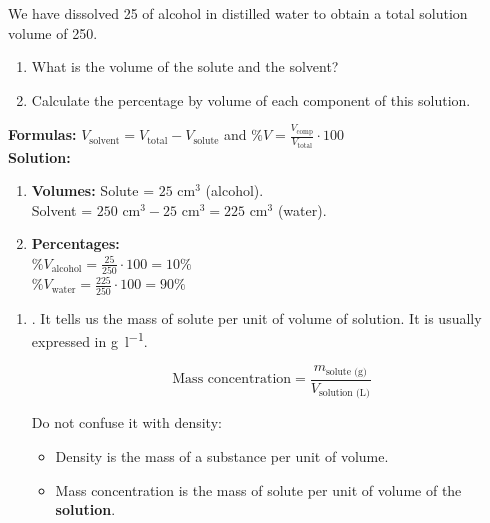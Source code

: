 \begin{exercise}
    We have dissolved \qty{25}{\cmcubicos} of alcohol in distilled water to obtain a total solution volume of \qty{250}{\cmcubicos}.
    \begin{enumerate}[label=\letraminuscula]
        \item What is the volume of the solute and the solvent?
        \item Calculate the percentage by volume of each component of this solution.
    \end{enumerate}
    \begin{solu}
        \textbf{Formulas:} $V_{\text{solvent}} = V_{\text{total}} - V_{\text{solute}}$ and $\%V = \frac{V_{\text{comp}}}{V_{\text{total}}} \cdot 100$ \\
        \textbf{Solution:}
        \begin{enumerate}[label=\alph*)]
            \item \textbf{Volumes:} Solute = $25 \text{ cm}^3$ (alcohol). \\
            Solvent = $250 \text{ cm}^3 - 25 \text{ cm}^3 = 225 \text{ cm}^3$ (water).
            \item \textbf{Percentages:} \\
            $\%V_{\text{alcohol}} = \frac{25}{250} \cdot 100 = 10\%$ \\
            $\%V_{\text{water}} = \frac{225}{250} \cdot 100 = 90\%$
        \end{enumerate}
    \end{solu}
\end{exercise}


\begin{enumerate}[label=\numberballmDarkTeal,resume]
\item {}.
It tells us the mass of solute per unit of volume of solution.
It is usually expressed in \unit{\g\per\litre}.

\begin{equation*}
    \text{Mass concentration} = \dfrac{m_{\text{solute (g)}}}{V_{\text{solution (L)}}}
\end{equation*}

Do not confuse it with density:
\begin{itemize}
    \item Density is the mass of a substance per unit of volume.
    \item Mass concentration is the mass of solute per unit of volume of the \textbf{solution}.
\end{itemize}
\end{enumerate}

